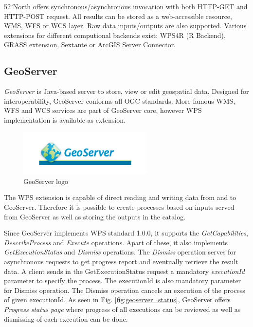 52$^{\circ}$North offers synchronous/asynchronous invocation with both HTTP-GET and HTTP-POST request. All results can be stored as
a web-accessible resource, WMS, WFS or WCS layer. Raw data inputs/outputs are also supported. Various extensions for different
computional backends exist: WPS4R (R Backend), GRASS extension, Sextante or ArcGIS Server Connector.

\subsection{GeoServer}
\textit{GeoServer} is Java-based server to store, view or edit geospatial data. Designed for interoperability, GeoServer conforms
all OGC standards. More famous WMS, WFS and WCS services are part of GeoServer core, however WPS implementation is available as 
extension.

\begin{figure}[h!]
\centering
\includegraphics[width=0.6\textwidth]{img/geoserver.jpg}
\caption{GeoServer logo}
\label{fig:geoserver_logo}
\end{figure}

The WPS extension is capable of direct reading and writing data from and to GeoServer. Therefore it is possible to create processes
based on inputs served from GeoServer as well as storing the outputs in the catalog.

Since GeoServer implements WPS standard 1.0.0, it supports the \textit{GetCapabilities}, \textit{DescribeProcess} and \textit{Execute}
operations. Apart of these, it also implements \textit{GetExecutionStatus} and \textit{Dismiss} operations. The \textit{Dismiss} operation
serves for asynchronous requests to get progress report and eventually retrieve the result data. A client sends in the GetExecutionStatus
request a mandatory \textit{executionId} parameter to specify the process. The executionId is also mandatory parameter for Dismiss operation. The Dismiss operation cancels an execution of the process of given executionId. As seen in Fig. \ref{fig:geoserver_status},
GeoServer offers \textit{Progress status page} where progress of all executions can be reviewed as well as dismissing of each execution
can be done.

